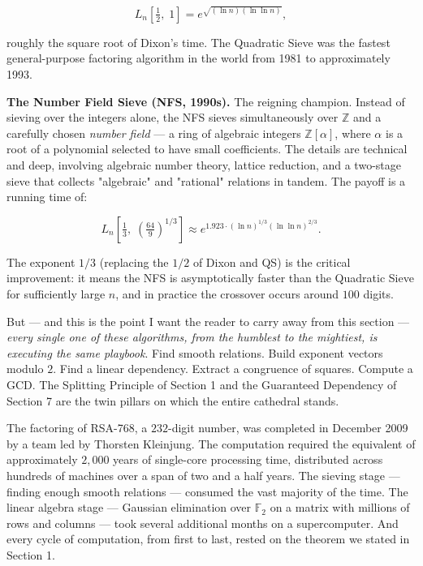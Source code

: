 \documentclass[11pt,openany]{book}
\theoremstyle{definition}
\theoremstyle{plain}
\theoremstyle{remark}
\begin{document}
$$L_n\!\left[\tfrac{1}{2}, \; 1\right] = e^{\sqrt{(\ln n)(\ln \ln n)}},$$

roughly the square root of Dixon's time. The Quadratic Sieve was the fastest general-purpose factoring algorithm in the world from 1981 to approximately 1993.

\textbf{The Number Field Sieve (NFS, 1990s).} The reigning champion. Instead of sieving over the integers alone, the NFS sieves simultaneously over $\mathbb{Z}$ and a carefully chosen \textit{number field} — a ring of algebraic integers $\mathbb{Z}[\alpha]$, where $\alpha$ is a root of a polynomial selected to have small coefficients. The details are technical and deep, involving algebraic number theory, lattice reduction, and a two-stage sieve that collects "algebraic" and "rational" relations in tandem. The payoff is a running time of:

$$L_n\!\left[\tfrac{1}{3}, \; \left(\tfrac{64}{9}\right)^{\!1/3}\right] \approx e^{1.923 \cdot (\ln n)^{1/3} (\ln \ln n)^{2/3}}.$$

The exponent $1/3$ (replacing the $1/2$ of Dixon and QS) is the critical improvement: it means the NFS is asymptotically faster than the Quadratic Sieve for sufficiently large $n$, and in practice the crossover occurs around $100$ digits.

But — and this is the point I want the reader to carry away from this section — \textit{every single one of these algorithms, from the humblest to the mightiest, is executing the same playbook}. Find smooth relations. Build exponent vectors modulo $2$. Find a linear dependency. Extract a congruence of squares. Compute a GCD. The Splitting Principle of Section 1 and the Guaranteed Dependency of Section 7 are the twin pillars on which the entire cathedral stands.

The factoring of RSA-768, a $232$-digit number, was completed in December 2009 by a team led by Thorsten Kleinjung. The computation required the equivalent of approximately $2{,}000$ years of single-core processing time, distributed across hundreds of machines over a span of two and a half years. The sieving stage — finding enough smooth relations — consumed the vast majority of the time. The linear algebra stage — Gaussian elimination over $\mathbb{F}_2$ on a matrix with millions of rows and columns — took several additional months on a supercomputer. And every cycle of computation, from first to last, rested on the theorem we stated in Section 1.
\end{document}
